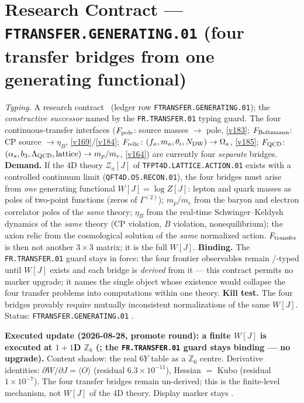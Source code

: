 \section*{Research Contract --- \texttt{FTRANSFER.GENERATING.01} (four transfer bridges from one generating functional)}
\noindent\emph{Typing.} A research contract \mO\ (ledger row \texttt{FTRANSFER.GENERATING.01});
the \emph{constructive successor} named by the \texttt{FR.TRANSFER.01} typing guard.  The four
continuous-transfer interfaces ($F_{\rm pole}$: source masses $\to$ pole, \vref{v183};
$F_{\rm Boltzmann}$: CP source $\to\eta_B$, \vref{v169}/\vref{v184}; $F_{\rm relic}$:
$(f_a,m_a,\theta_i,N_{\rm DW})\to\Omega_a$, \vref{v185}; $F_{\rm QCD}$:
$(\alpha_s,b_3,\Lambda_{\rm QCD},\text{lattice})\to m_p/m_e$, \vref{v164}) are currently four
\emph{separate} bridges.  \textbf{Demand.}  If the 4D theory $\mathcal Z_a[J]$ of
\texttt{TFPT4D.LATTICE.ACTION.01} exists with a controlled continuum limit
(\texttt{QFT4D.OS.RECON.01}), the four bridges must arise from \emph{one} generating functional
$W[J]=\log Z[J]$: lepton and quark masses as poles of two-point functions (zeros of
$\Gamma^{(2)}$); $m_p/m_e$ from the baryon and electron correlator poles of the \emph{same}
theory; $\eta_B$ from the real-time Schwinger--Keldysh dynamics of the \emph{same} theory (CP
violation, $B$ violation, nonequilibrium); the axion relic from the cosmological solution of
the \emph{same} normalized action.  $F_{\rm transfer}$ is then not another $3\times3$ matrix;
it is the full $W[J]$.  \textbf{Binding.}  The \texttt{FR.TRANSFER.01} guard stays in force:
the four frontier observables remain \mC/\mO-typed until $W[J]$ exists and each bridge is
\emph{derived} from it --- this contract permits no marker upgrade; it names the single object
whose existence would collapse the four transfer problems into computations within one theory.
\textbf{Kill test.}  The four bridges provably require mutually inconsistent normalizations of
the same $W[J]$.  Status: \texttt{FTRANSFER.GENERATING.01} \mO.

\par\smallskip\noindent\textbf{Executed update (2026-08-28, promote round): a finite $W[J]$ is
executed at $1{+}1$D $\mathbb Z_6$
(; the
\texttt{FR.TRANSFER.01} guard stays binding --- no upgrade).}
Content shadow: the real $6Y$ table as a $\mathbb Z_6$ centre.  Derivative identities:
$\partial W/\partial J=\langle O\rangle$ (residual $6.3\times10^{-11}$), Hessian $=$ Kubo
(residual $1\times10^{-7}$).  The four transfer bridges remain un-derived; this is the
finite-level mechanism, not $W[J]$ of the 4D theory.  Display marker stays \mO.

